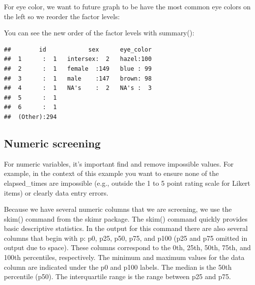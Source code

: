 \documentclass[
]{krantz}
\makeatletter
\newenvironment{Shaded}{\begin{snugshade}}{\end{snugshade}}
\newcommand{\DataTypeTok}[1]{\textcolor[rgb]{0.27,0.27,0.27}{#1}}
\newcommand{\KeywordTok}[1]{\textcolor[rgb]{0.27,0.27,0.27}{\textbf{#1}}}
\newcommand{\NormalTok}[1]{#1}
\newcommand{\OperatorTok}[1]{\textcolor[rgb]{0.43,0.43,0.43}{\textbf{#1}}}
\newcommand{\StringTok}[1]{\textcolor[rgb]{0.5,0.5,0.5}{#1}}
\newenvironment{kframe}{%
\medskip{}
\setlength{\fboxsep}{.8em}
 \def\at@end@of@kframe{}%
 \ifinner\ifhmode%
  \def\at@end@of@kframe{\end{minipage}}%
  \begin{minipage}{\columnwidth}%
 \fi\fi%
 \def\FrameCommand##1{\hskip\@totalleftmargin \hskip-\fboxsep
 \colorbox{shadecolor}{##1}\hskip-\fboxsep
     \hskip-\linewidth \hskip-\@totalleftmargin \hskip\columnwidth}%
 \MakeFramed {\advance\hsize-\width
   \@totalleftmargin\z@ \linewidth\hsize
   \@setminipage}}%
 {\par\unskip\endMakeFramed%
 \at@end@of@kframe}
\renewenvironment{Shaded}{\begin{kframe}}{\end{kframe}}
\makeatother
\begin{document}
For eye color, we want to future graph to be have the most common eye colors on the left so we reorder the factor levels:

\begin{Shaded}
\end{Shaded}

You can see the new order of the factor levels with summary():

\begin{Shaded}
\end{Shaded}

\begin{verbatim}
##        id            sex      eye_color  
##  1      :  1   intersex:  2   hazel:100  
##  2      :  1   female  :149   blue : 99  
##  3      :  1   male    :147   brown: 98  
##  4      :  1   NA's    :  2   NA's :  3  
##  5      :  1                             
##  6      :  1                             
##  (Other):294
\end{verbatim}

\hypertarget{numeric-screening-3}{%
\subsection{Numeric screening}\label{numeric-screening-3}}

For numeric variables, it's important find and remove impossible values. For example, in the context of this example you want to ensure none of the elapsed\_times are impossible (e.g., outside the 1 to 5 point rating scale for Likert items) or clearly data entry errors.

Because we have several numeric columns that we are screening, we use the skim() command from the skimr package. The skim() command quickly provides basic descriptive statistics. In the output for this command there are also several columns that begin with p: p0, p25, p50, p75, and p100 (p25 and p75 omitted in output due to space). These columns correspond to the 0th, 25th, 50th, 75th, and 100th percentiles, respectively. The minimum and maximum values for the data column are indicated under the p0 and p100 labels. The median is the 50th percentile (p50). The interquartile range is the range between p25 and p75.
\end{document}
